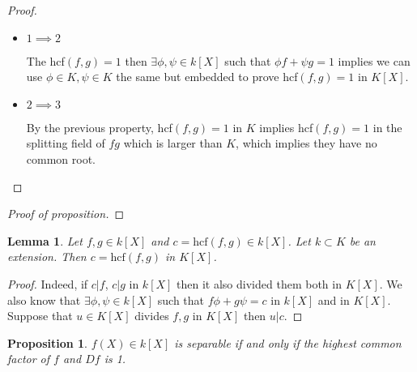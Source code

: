 \documentclass{article}
\theoremstyle{definition}
\theoremstyle{plain}%
\newtheorem{lem}[thm]{Lemma}
\newtheorem{prop}[thm]{Proposition}
\theoremstyle{remark}
\begin{document}
\begin{proof}
    \hspace{0.1em}
    \begin{itemize}
        \item $1 \implies 2$
        
        The hcf$(f,g) = 1$ then $\exists \phi, \psi \in k[X]$ such that $\phi f + \psi g = 1$ implies we can use $\phi \in K, \psi \in K$ the same but embedded to prove hcf$(f,g) = 1$ in $K[X]$.
        \item $2 \implies 3$
        
        By the previous property, hcf$(f, g) = 1$ in $K$ implies hcf$(f, g) = 1$ in the splitting field of $fg$ which is larger than $K$, which implies they have no common root.
    \end{itemize}
\end{proof}

\begin{proof}[Proof of proposition]
    
\end{proof}

\begin{lem}
    Let $f,g \in k[X]$ and $c =\text{hcf}(f,g) \in k[X]$. Let $k \subset K$ be an extension. Then $c = \text{hcf}(f,g)$ in $K[X]$.
\end{lem}

\begin{proof}
    Indeed, if $c | f$, $c | g$ in $k[X]$ then it also divided them both in $K[X]$. We also know that $\exists \phi, \psi \in k[X]$ such that $f\phi + g\psi = c$ in $k[X]$ and in $K[X]$. Suppose that $u \in K[X]$ divides $f,g$ in $K[X]$ then $u | c$.
\end{proof}

\begin{prop}
    $f(X) \in k[X]$ is separable if and only if the highest common factor of $f$ and $Df$ is 1.
\end{prop}
\end{document}
